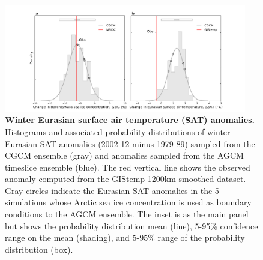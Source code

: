 \documentclass{nature}
\begin{document}
\begin{figure}%
\centering
\noindent\includegraphics[width=25pc]{Word/Figure_2.pdf}
\caption{\textbf{Winter Eurasian surface air temperature (SAT) anomalies.} Histograms and associated probability distributions of winter Eurasian SAT anomalies (2002-12 minus 1979-89) sampled from the CGCM ensemble (gray) and anomalies sampled from the AGCM timeslice ensemble (blue). The red vertical line shows the observed anomaly computed from the GIStemp 1200km smoothed dataset. Gray circles indicate the Eurasian SAT anomalies in the 5 simulations whose Arctic sea ice concentration is used as boundary conditions to the AGCM ensemble. The inset is as the main panel but shows the probability distribution mean (line), 5-95\% confidence range on the mean (shading), and 5-95\% range of the probability distribution (box).
} %
\label{fig:fig2} 
\end{figure}
\end{document}
